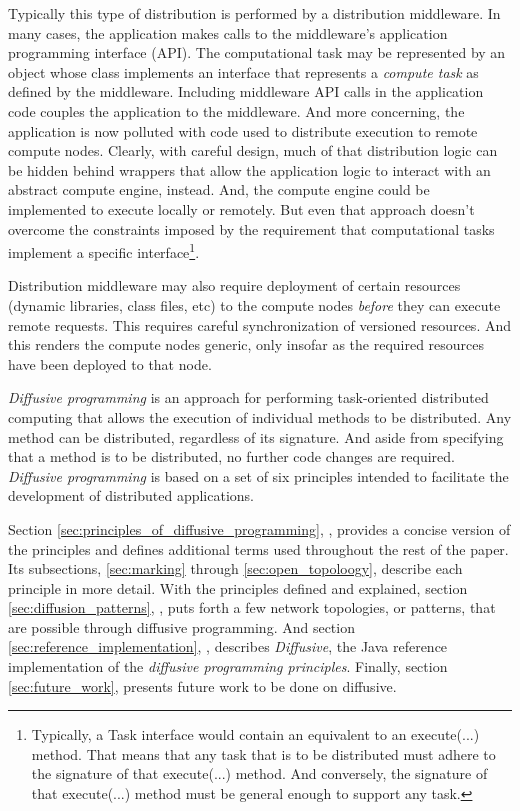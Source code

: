 \documentclass[11pt]{article}
\begin{document}
Typically this type of distribution is performed by a distribution middleware. In many cases, the application makes calls to the middleware's application programming interface (API). The computational task may be represented by an object whose class implements an interface that represents a \emph{compute task} as defined by the middleware. Including middleware API calls in the application code couples the application to the middleware. And more concerning, the application is now polluted with code used to distribute execution to remote compute nodes. Clearly, with careful design, much of that distribution logic can be hidden behind wrappers that allow the application logic to interact with an abstract compute engine, instead. And, the compute engine could be implemented to execute locally or remotely. But even that approach doesn't overcome the constraints imposed by the requirement that computational tasks implement a specific interface\footnote{Typically, a \textsf{Task} interface would contain an equivalent to an \textsf{execute(...)} method. That means that any task that is to be distributed must adhere to the signature of that \textsf{execute(...)} method. And conversely, the signature of that \textsf{execute(...)} method must be general enough to support any task.}.

Distribution middleware may also require deployment of certain resources (dynamic libraries, class files, etc) to the compute nodes \emph{before} they can execute remote requests. This requires careful synchronization of versioned resources. And this renders the compute nodes generic, only insofar as the required resources have been deployed to that node.

\emph{Diffusive programming} is an approach for performing task-oriented distributed computing that allows the execution of individual methods to be distributed. Any method can be distributed, regardless of its signature. And aside from specifying that a method is to be distributed, no further code changes are required. \emph{Diffusive programming} is based on a set of six principles intended to facilitate the development of distributed applications. 

Section \ref{sec:principles_of_diffusive_programming}, \textit{}, provides a concise version of the principles and defines additional terms used throughout the rest of the paper. Its subsections, \ref{sec:marking} through \ref{sec:open_topoloogy}, describe each principle in more detail. With the principles defined and explained, section \ref{sec:diffusion_patterns}, \textit{}, puts forth a few network topologies, or patterns, that are possible through diffusive programming. And section \ref{sec:reference_implementation}, \textit{}, describes \emph{Diffusive}, the Java reference implementation of the \emph{diffusive programming principles}. Finally, section \ref{sec:future_work}, presents future work to be done on diffusive.
\end{document}
